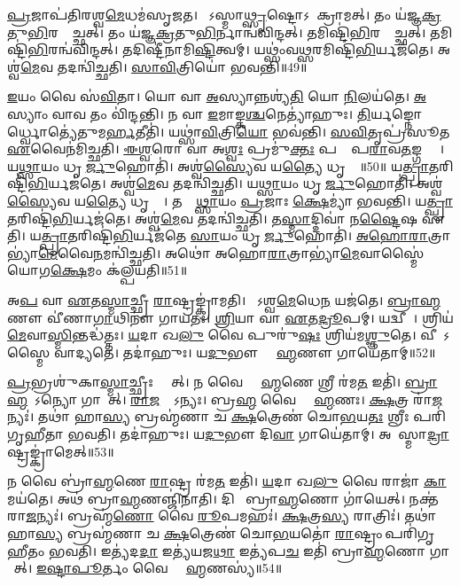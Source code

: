\ul{𑌪𑍍𑌰}𑌜𑌾𑌪॑𑌤𑌿𑌰𑌶𑍍𑌵\ul{𑌮𑍇}𑌧𑌮॑𑌸𑍃𑌜𑌤।
𑌸𑍋᳚𑌽𑌸𑍍𑌮𑌾\ul{𑌥𑍍𑌸𑍃}𑌷𑍍𑌟𑍋\-𑌽𑌪𑌾᳚𑌕𑍍𑌰𑌾𑌮𑌤𑍍।
𑌤𑌂 𑌯॑𑌜𑍍𑌞\ul{𑌕𑍍𑌰}𑌤𑍁\ul{𑌭𑌿}𑌰𑌨𑍍𑌵𑍈᳚𑌚𑍍𑌛𑌤𑍍।
𑌤𑌂 𑌯॑𑌜𑍍𑌞\ul{𑌕𑍍𑌰}𑌤𑍁\ul{𑌭𑌿}𑌰𑍍𑌨𑌾𑌨𑍍𑌵॑𑌵𑌿𑌨𑍍𑌦𑌤𑍍।
𑌤𑌮𑌿𑌷𑍍𑌟𑌿॑\ul{𑌭𑌿}𑌰𑌨𑍍𑌵𑍈᳚𑌚𑍍𑌛𑌤𑍍।
𑌤𑌮𑌿𑌷𑍍𑌟𑌿॑\ul{𑌭𑌿}𑌰𑌨𑍍𑌵॑𑌵𑌿𑌨𑍍𑌦𑌤𑍍।
𑌤𑌦𑌿𑌷𑍍𑌟𑍀॑𑌨𑌾𑌮𑌿\ul{𑌷𑍍𑌟𑌿}𑌤𑍍𑌵𑌮𑍍।
𑌯𑌥𑍍𑌸𑌂॑𑌵\ul{𑌥𑍍𑌸}𑌰𑌮𑌿𑌷𑍍𑌟𑌿॑\ul{𑌭𑌿}𑌰𑍍𑌯𑌜॑𑌤𑍇।
𑌅𑌶𑍍𑌵॑\ul{𑌮𑍇}𑌵 𑌤𑌦𑌨𑍍𑌵𑌿॑𑌚𑍍𑌛𑌤𑌿।
\ul{𑌸𑌾}\ul{𑌵𑌿}𑌤𑍍𑌰𑌿𑌯𑍋॑ 𑌭𑌵𑌨𑍍𑌤𑌿॥49॥

\ul{𑌇}𑌯𑌂 𑌵𑍈 𑌸॑\ul{𑌵𑌿}𑌤𑌾।
𑌯𑍋 𑌵𑌾 \ul{𑌅}𑌸𑍍𑌯𑌾𑌨𑍍𑌨𑌶𑍍𑌯॑\ul{𑌤𑌿} 𑌯𑍋 \ul{𑌨𑌿}𑌲𑌯॑𑌤𑍇।
\ul{𑌅}𑌸𑍍𑌯𑌾𑌂 𑌵𑌾𑌵 𑌤𑌂 𑌵𑌿॑𑌨𑍍𑌦𑌨𑍍𑌤𑌿।
𑌨 𑌵𑌾 \ul{𑌇}𑌮𑌾𑌙𑍍𑌕\ul{𑌶𑍍𑌚}𑌨𑍇𑌤𑍍𑌯𑌾॑𑌹𑍁𑌃।
\ul{𑌤𑌿}𑌰𑍍𑌯𑌙𑍍𑌨𑍋𑌰𑍍𑌧𑍍𑌵𑍋𑌤𑍍𑌯𑍇॑𑌤𑍁𑌮\ul{𑌰𑍍𑌹}𑌤𑍀𑌤𑌿॑।
𑌯𑌥𑍍𑌸𑌾॑\ul{𑌵𑌿}𑌤𑍍𑌰𑌿\ul{𑌯𑍋} 𑌭𑌵॑𑌨𑍍𑌤𑌿।
\ul{𑌸}\ul{𑌵𑌿}𑌤𑍃𑌪𑍍𑌰॑𑌸𑍂𑌤 \ul{𑌏}𑌵𑍈𑌨॑𑌮𑌿𑌚𑍍𑌛𑌤𑌿।
\ul{𑌈}\ul{𑌶𑍍𑌵}𑌰𑍋 𑌵𑌾 𑌅\ul{𑌶𑍍𑌵𑌃} 𑌪𑍍𑌰𑌮𑍁॑\ul{𑌕𑍍𑌤𑌃} 𑌪𑌰𑌾𑌂᳚ 𑌪\ul{𑌰𑌾}𑌵\ul{𑌤}𑌙𑍍𑌗𑌨𑍍𑌤𑍋𑌃᳚।
𑌯\ul{𑌥𑍍𑌸𑌾}𑌯𑌂 𑌧𑍃𑌤𑍀᳚\ul{𑌰𑍍𑌜𑍁}𑌹𑍋𑌤𑌿॑।
𑌅𑌶𑍍𑌵॑\ul{𑌸𑍍𑌯𑍈}𑌵 𑌯\ul{𑌤𑍍𑌯𑍈} 𑌧𑍃𑌤𑍍𑌯𑍈᳚॥50॥ 𑌯\ul{𑌤𑍍𑌪𑍍𑌰𑌾}𑌤𑌰𑌿𑌷𑍍𑌟𑌿॑\ul{𑌭𑌿}𑌰𑍍𑌯𑌜॑𑌤𑍇।
𑌅𑌶𑍍𑌵॑\ul{𑌮𑍇}𑌵 𑌤𑌦𑌨𑍍𑌵𑌿॑𑌚𑍍𑌛𑌤𑌿।
𑌯\ul{𑌥𑍍𑌸𑌾}𑌯𑌂 𑌧𑍃𑌤𑍀᳚\ul{𑌰𑍍𑌜𑍁}𑌹𑍋𑌤𑌿॑।
𑌅𑌶𑍍𑌵॑\ul{𑌸𑍍𑌯𑍈}𑌵 𑌯\ul{𑌤𑍍𑌯𑍈} 𑌧𑍃𑌤𑍍𑌯𑍈᳚।
𑌤𑌸𑍍𑌮𑌾᳚\ul{𑌥𑍍𑌸𑌾}𑌯𑌂 \ul{𑌪𑍍𑌰}𑌜𑌾𑌃 \ul{𑌕𑍍𑌷𑍇}𑌮𑍍𑌯𑌾॑ 𑌭𑌵𑌨𑍍𑌤𑌿।
𑌯\ul{𑌤𑍍𑌪𑍍𑌰𑌾}𑌤𑌰𑌿𑌷𑍍𑌟𑌿॑\ul{𑌭𑌿}𑌰𑍍𑌯𑌜॑𑌤𑍇।
𑌅𑌶𑍍𑌵॑\ul{𑌮𑍇}𑌵 𑌤𑌦𑌨𑍍𑌵𑌿॑𑌚𑍍𑌛𑌤𑌿।
𑌤\ul{𑌸𑍍𑌮𑌾}𑌦𑍍𑌦𑌿𑌵𑌾॑ 𑌨\ul{𑌷𑍍𑌟𑍈}𑌷 𑌏॑𑌤𑌿।
𑌯\ul{𑌤𑍍𑌪𑍍𑌰𑌾}𑌤𑌰𑌿𑌷𑍍𑌟𑌿॑\ul{𑌭𑌿}𑌰𑍍𑌯𑌜॑𑌤𑍇 \ul{𑌸𑌾}𑌯𑌂 𑌧𑍃𑌤𑍀᳚\ul{𑌰𑍍𑌜𑍁}𑌹𑍋𑌤𑌿॑।
\ul{𑌅}\ul{𑌹𑍋}\ul{𑌰𑌾}𑌤𑍍𑌰𑌾𑌭𑍍𑌯𑌾॑\ul{𑌮𑍇}𑌵𑍈\ul{𑌨}𑌮𑌨𑍍𑌵𑌿॑𑌚𑍍𑌛𑌤𑌿।
𑌅𑌥𑍋॑ 𑌅𑌹𑍋\ul{𑌰𑌾}𑌤𑍍𑌰𑌾𑌭𑍍𑌯𑌾॑\ul{𑌮𑍇}𑌵𑌾𑌸𑍍𑌮𑍈॑ 𑌯𑍋𑌗\ul{𑌕𑍍𑌷𑍇}𑌮𑌂 𑌕॑𑌲𑍍𑌪𑌯𑌤𑌿॥51॥\anuvakamend[\ul{𑌭}\ul{𑌵}\ul{𑌨𑍍𑌤𑌿} 𑌧𑍃𑌤𑍍𑌯𑌾॑ 𑌏\ul{𑌨}𑌮𑌨𑍍𑌵𑌿॑\ul{𑌚𑍍𑌛}𑌤𑍍𑌯𑍇𑌕𑌂॑ 𑌚]

𑌅\ul{𑌪} 𑌵𑌾 \ul{𑌏}𑌤\ul{𑌸𑍍𑌮𑌾}𑌚𑍍𑌛𑍍𑌰𑍀 \ul{𑌰𑌾}𑌷𑍍𑌟𑍍𑌰𑌙𑍍𑌕𑍍𑌰𑌾॑𑌮𑌤𑌿।
𑌯𑍋᳚𑌽𑌶𑍍𑌵\ul{𑌮𑍇}𑌧𑍇\ul{𑌨} 𑌯𑌜॑𑌤𑍇।
\ul{𑌬𑍍𑌰𑌾}\ul{𑌹𑍍𑌮}𑌣𑍗 𑌵𑍀॑𑌣𑌾\ul{𑌗𑌾}𑌥𑌿𑌨𑍗॑ 𑌗𑌾𑌯𑌤𑌃।
\ul{𑌶𑍍𑌰𑌿}𑌯𑌾 𑌵𑌾 \ul{𑌏}𑌤\ul{𑌦𑍍𑌰𑍂}𑌪𑌮𑍍।
𑌯𑌦𑍍𑌵𑍀𑌣𑌾᳚।
𑌶𑍍𑌰𑌿𑌯॑\ul{𑌮𑍇}𑌵𑌾\ul{𑌸𑍍𑌮𑌿}𑌨𑍍𑌤𑌦𑍍𑌧॑𑌤𑍍𑌤𑌃।
\ul{𑌯}𑌦𑌾 𑌖\ul{𑌲𑍁} 𑌵𑍈 𑌪𑍁𑌰𑍁॑\ul{𑌷𑌃} 𑌶𑍍𑌰𑌿𑌯॑𑌮\ul{𑌶𑍍𑌞𑍁}𑌤𑍇।
𑌵𑍀𑌣𑌾᳚\-𑌽𑌸𑍍𑌮𑍈 𑌵𑌾𑌦𑍍𑌯𑌤𑍇।
𑌤𑌦𑌾॑𑌹𑍁𑌃।
𑌯\ul{𑌦𑍁}𑌭𑍗 𑌬𑍍𑌰𑌾᳚\ul{𑌹𑍍𑌮}𑌣𑍗 𑌗𑌾𑌯𑍇॑𑌤𑌾𑌮𑍍॥52॥

\ul{𑌪𑍍𑌰}𑌭𑍍𑌰𑌶𑍁॑𑌕𑌾\ul{𑌸𑍍𑌮𑌾}𑌚𑍍𑌛𑍍𑌰𑍀𑌃 𑌸𑍍𑌯𑌾᳚𑌤𑍍।
𑌨 𑌵𑍈 𑌬𑍍𑌰𑌾᳚\ul{𑌹𑍍𑌮}𑌣𑍇 𑌶𑍍𑌰𑍀 𑌰॑𑌮\ul{𑌤} 𑌇𑌤𑌿॑।
\ul{𑌬𑍍𑌰𑌾}\ul{𑌹𑍍𑌮}𑌣𑍋᳚\-𑌽𑌨𑍍𑌯𑍋 𑌗𑌾𑌯𑍇᳚𑌤𑍍।
\ul{𑌰𑌾}\ul{𑌜}𑌨𑍍𑌯𑍋᳚\-𑌽𑌨𑍍𑌯𑌃।
𑌬𑍍𑌰\ul{𑌹𑍍𑌮} 𑌵𑍈 𑌬𑍍𑌰𑌾᳚\ul{𑌹𑍍𑌮}𑌣𑌃।
\ul{𑌕𑍍𑌷}𑌤𑍍𑌰 𑌰𑌾॑\ul{𑌜}𑌨𑍍𑌯𑌃॑।
𑌤𑌥𑌾॑ 𑌹𑌾\ul{𑌸𑍍𑌯} 𑌬𑍍𑌰𑌹𑍍𑌮॑𑌣𑌾 𑌚 \ul{𑌕𑍍𑌷}𑌤𑍍𑌰𑍇𑌣॑ 𑌚𑍋\ul{𑌭}𑌯\ul{𑌤𑌃} 𑌶𑍍𑌰𑍀𑌃 𑌪𑌰𑌿॑𑌗𑍃𑌹𑍀𑌤𑌾 𑌭𑌵𑌤𑌿।
𑌤𑌦𑌾॑𑌹𑍁𑌃।
𑌯\ul{𑌦𑍁}𑌭𑍗 𑌦𑌿\ul{𑌵𑌾} 𑌗𑌾𑌯𑍇॑𑌤𑌾𑌮𑍍।
𑌅𑌪𑌾᳚𑌸𑍍𑌮𑌾\ul{𑌦𑍍𑌰𑌾}𑌷𑍍𑌟𑍍𑌰𑌙𑍍𑌕𑍍𑌰𑌾॑𑌮𑍇𑌤𑍍॥53॥

𑌨 𑌵𑍈 𑌬𑍍𑌰𑌾॑\ul{𑌹𑍍𑌮}𑌣𑍇 \ul{𑌰𑌾}𑌷𑍍𑌟𑍍𑌰 𑌰॑𑌮\ul{𑌤} 𑌇𑌤𑌿॑।
\ul{𑌯}𑌦𑌾 𑌖\ul{𑌲𑍁} 𑌵𑍈 𑌰𑌾𑌜𑌾॑ \ul{𑌕𑌾}𑌮𑌯॑𑌤𑍇।
𑌅𑌥॑ 𑌬𑍍𑌰𑌾\ul{𑌹𑍍𑌮}𑌣𑌞𑍍𑌜𑌿॑𑌨𑌾𑌤𑌿।
𑌦𑌿𑌵𑌾᳚ 𑌬𑍍𑌰𑌾\ul{𑌹𑍍𑌮}𑌣𑍋 𑌗𑌾॑𑌯𑍇𑌤𑍍।
𑌨𑌕𑍍𑌤॑ 𑌰𑌾\ul{𑌜}𑌨𑍍𑌯𑌃॑।
𑌬𑍍𑌰𑌹𑍍𑌮॑\ul{𑌣𑍋} 𑌵𑍈 \ul{𑌰𑍂}𑌪𑌮𑌹𑌃॑।
\ul{𑌕𑍍𑌷}𑌤𑍍𑌰\ul{𑌸𑍍𑌯} 𑌰𑌾𑌤𑍍𑌰𑌿𑌃॑।
𑌤𑌥𑌾॑ 𑌹𑌾\ul{𑌸𑍍𑌯} 𑌬𑍍𑌰𑌹𑍍𑌮॑𑌣𑌾 𑌚 \ul{𑌕𑍍𑌷}𑌤𑍍𑌰𑍇𑌣॑ 𑌚𑍋\ul{𑌭}𑌯𑌤𑍋॑ \ul{𑌰𑌾}𑌷𑍍𑌟𑍍𑌰𑌂 𑌪𑌰𑌿॑𑌗𑍃𑌹𑍀𑌤𑌂 𑌭𑌵𑌤𑌿।
𑌇𑌤𑍍𑌯॑𑌦\ul{𑌦𑌾} 𑌇𑌤𑍍𑌯॑𑌯𑌜\ul{𑌥𑌾} 𑌇𑌤𑍍𑌯॑𑌪\ul{𑌚} 𑌇𑌤𑌿॑ 𑌬𑍍𑌰𑌾\ul{𑌹𑍍𑌮}𑌣𑍋 𑌗𑌾𑌯𑍇᳚𑌤𑍍।
\ul{𑌇}\ul{𑌷𑍍𑌟𑌾}\ul{𑌪𑍂}𑌰𑍍𑌤𑌂 𑌵𑍈 𑌬𑍍𑌰𑌾᳚\ul{𑌹𑍍𑌮}𑌣𑌸𑍍𑌯॑॥54॥

